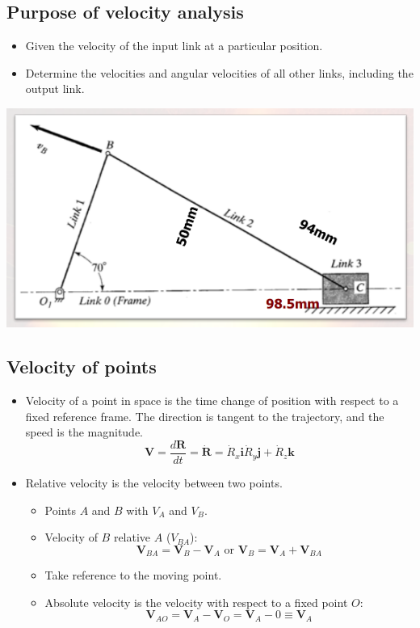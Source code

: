 \documentclass[11pt]{article}
\begin{document}
\subsection{Purpose of velocity analysis}
\label{sec:org0be1619}
\begin{itemize}
\item Given the velocity of the input link at a particular position.
\item Determine the velocities and angular velocities of all other links, including the output link.
\end{itemize}

\begin{center}
\includegraphics[width=.9\linewidth]{./images/velocity-analysis.png}
\end{center}
\subsection{Velocity of points}
\label{sec:org1400a5a}
\begin{itemize}
\item Velocity of a point in space is the time change of position with respect to a fixed reference frame. The direction is tangent to the trajectory, and the speed is the magnitude.
\[\boldsymbol{V} = \frac{d \boldsymbol{R}}{dt} = \dot{\boldsymbol{R}} = \dot{R}_x \boldsymbol{i} \dot{R}_y \boldsymbol{j} + \dot{R}_z \boldsymbol{k}\]
\item Relative velocity is the velocity between two points.
\begin{itemize}
\item Points \(A\) and \(B\) with \(V_A\) and \(V_B\).
\item Velocity of \(B\) relative \(A\) (\(V_{BA}\)):
\[\boldsymbol{V}_{BA} = \boldsymbol{V}_B - \boldsymbol{V}_A \text{ or } \boldsymbol{V}_B = \boldsymbol{V}_A + \boldsymbol{V}_{BA}\]
\item Take reference to the moving point.
\item Absolute velocity is the velocity with respect to a fixed point \(O\):
\[\boldsymbol{V}_{AO} = \boldsymbol{V}_A - \boldsymbol{V}_O = \boldsymbol{V}_A - 0 \equiv \boldsymbol{V}_A\]
\end{itemize}
\end{itemize}
\end{document}
